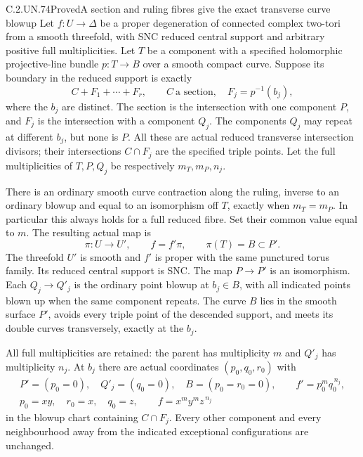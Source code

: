 \begin{statement}{C.2.UN.74}{Proved}{A section and ruling fibres give the exact transverse curve blowup}
Let $f:U\to\Delta$ be a proper degeneration of connected
complex two-tori from a smooth threefold, with SNC reduced
central support and arbitrary positive full multiplicities.
Let $T$ be a component with a specified holomorphic
projective-line bundle $p:T\to B$ over a smooth compact
curve. Suppose its boundary in the reduced support is
exactly
\[
           C+F_1+\cdots+F_r,\qquad
           C\ \text{a section},\quad F_j=p^{-1}(b_j),
\tag{C.RC.1}
\]
where the $b_j$ are distinct. The section is the
intersection with one component $P$, and $F_j$ is the
intersection with a component $Q_j$. The components
$Q_j$ may repeat at different $b_j$, but none is $P$.
All these are actual reduced transverse intersection
divisors; their intersections $C\cap F_j$ are the
specified triple points. Let the full multiplicities
of $T,P,Q_j$ be respectively $m_T,m_P,n_j$.

There is an ordinary smooth curve contraction along
the ruling, inverse to an ordinary blowup and equal
to an isomorphism off $T$, exactly when
$m_T=m_P$. In particular this always holds for a
full reduced fibre. Set their common value equal
to $m$. The resulting actual map is
\[
              \pi:U\longrightarrow U',\qquad
              f=f'\pi,\qquad \pi(T)=B\subset P'.
\tag{C.RC.2}
\]
The threefold $U'$ is smooth and $f'$ is proper with
the same punctured torus family. Its reduced central
support is SNC. The map $P\to P'$ is an isomorphism.
Each $Q_j\to Q'_j$ is the ordinary point blowup at
$b_j\in B$, with all indicated points blown up when
the same component repeats. The curve $B$ lies in
the smooth surface $P'$, avoids every triple point
of the descended support, and meets its double
curves transversely, exactly at the $b_j$.

All full multiplicities are retained: the parent
has multiplicity $m$ and $Q'_j$ has multiplicity
$n_j$. At $b_j$ there are actual coordinates
$(p_0,q_0,r_0)$ with
\[
 \begin{gathered}
 P'=(p_0=0),\quad Q'_j=(q_0=0),\quad
 B=(p_0=r_0=0),\qquad f'=p_0^m q_0^{\,n_j},\\
 p_0=xy,\quad r_0=x,\quad q_0=z,\qquad
                         f=x^m y^m z^{\,n_j}
 \end{gathered}
\tag{C.RC.3}
\]
in the blowup chart containing $C\cap F_j$.
Every other component and every neighbourhood away
from the indicated exceptional configurations are
unchanged.


\end{statement}
